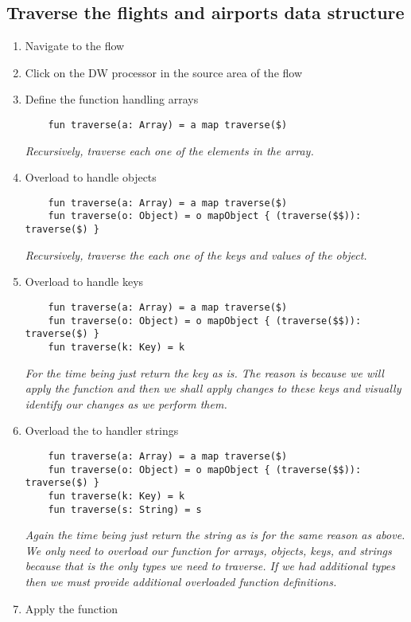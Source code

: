 \subsection{Traverse the flights and airports data structure}
\begin{enumerate}
\item Navigate to the  flow
\item Click on the DW processor in the source area of the flow
\item Define the  function handling arrays
  \begin{verbatim}
    fun traverse(a: Array) = a map traverse($)
  \end{verbatim}
  \emph{
    Recursively, traverse each one of the elements in the array.
  }
\item Overload  to handle objects
  \begin{verbatim}
    fun traverse(a: Array) = a map traverse($)
    fun traverse(o: Object) = o mapObject { (traverse($$)): traverse($) }
  \end{verbatim}
  \emph{
    Recursively, traverse the each one of the keys and values of the object. 
  }
\item Overload  to handle keys
  \begin{verbatim}
    fun traverse(a: Array) = a map traverse($)
    fun traverse(o: Object) = o mapObject { (traverse($$)): traverse($) }
    fun traverse(k: Key) = k
  \end{verbatim}
  \emph{
    For the time being just return the key as is.  The reason is because we will apply the function and then we shall apply changes to these keys and visually identify our changes as we perform them.
  }
\item Overload the  to handler strings
  \begin{verbatim}
    fun traverse(a: Array) = a map traverse($)
    fun traverse(o: Object) = o mapObject { (traverse($$)): traverse($) }
    fun traverse(k: Key) = k
    fun traverse(s: String) = s
  \end{verbatim}
  \emph{
    Again the time being just return the string as is for the same reason as above.
    \newline
    We only need to overload our  function for arrays, objects, keys, and strings because that is the only types we need to traverse.  If we had additional types then we must provide additional overloaded function definitions.
  }
\item Apply the  function

\end{enumerate}
